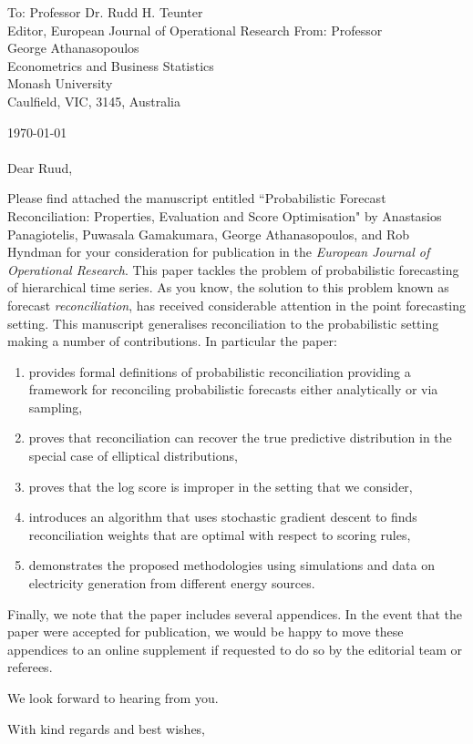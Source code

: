 \documentclass[11pt,a4paper]{letter}
\date{}
\begin{document}
 \begin{letter}{To: Professor Dr. Rudd H. Teunter\\
    Editor, European Journal of Operational Research}
    From: Professor\\
    George Athanasopoulos\\
    Econometrics and Business Statistics\\
    Monash University\\
    Caulfield, VIC, 3145, Australia

 \opening{\today\ \\\\Dear Ruud,}
 \medskip

Please find attached the manuscript entitled ``Probabilistic Forecast Reconciliation: Properties, Evaluation and Score Optimisation" by Anastasios Panagiotelis, Puwasala Gamakumara, George Athanasopoulos, and Rob Hyndman for your consideration for publication in the \textit{European Journal of Operational Research}.  This paper tackles the problem of probabilistic forecasting of hierarchical time series. As you know, the solution to this problem known as forecast \textit{reconciliation}, has received considerable attention in the point forecasting setting. This manuscript generalises reconciliation to the probabilistic setting making a number of contributions.  In particular the paper:
\begin{enumerate}
	\item provides formal definitions of probabilistic reconciliation providing a framework for reconciling probabilistic forecasts either analytically or via sampling,
	\item proves that reconciliation can recover the true predictive distribution in the special case of elliptical distributions,
	\item proves that the log score is improper in the setting that we consider,
	\item introduces an algorithm that uses stochastic gradient descent to finds reconciliation weights that are optimal with respect to scoring rules,
	\item demonstrates the proposed methodologies using simulations and data on electricity generation from different energy sources.
\end{enumerate}

Finally, we note that the paper includes several appendices.  In the event that the paper were accepted for publication, we would be happy to move these appendices to an online supplement if requested to do so by the editorial team or referees.

We look forward to hearing from you.

 \closing{With kind regards and best wishes,}

 \end{letter}
\end{document}
